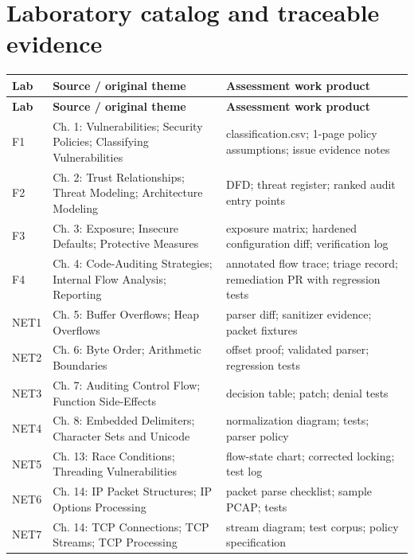 \documentclass[10pt,letterpaper]{article}
\begin{document}
\section{Laboratory catalog and traceable evidence}
\begingroup\footnotesize\setlength\tabcolsep{3pt}
\begin{longtable}{>{\raggedright\arraybackslash}p{}>{\raggedright\arraybackslash}p{}>{\raggedright\arraybackslash}p{}}\toprule
\textbf{Lab} & \textbf{Source / original theme} & \textbf{Assessment work product}\\\midrule\endfirsthead
\toprule \textbf{Lab} & \textbf{Source / original theme} & \textbf{Assessment work product}\\\midrule\endhead
F1 & Ch. 1: Vulnerabilities; Security Policies; Classifying Vulnerabilities & classification.csv; 1-page policy assumptions; issue evidence notes\\\midrule
F2 & Ch. 2: Trust Relationships; Threat Modeling; Architecture Modeling & DFD; threat register; ranked audit entry points\\\midrule
F3 & Ch. 3: Exposure; Insecure Defaults; Protective Measures & exposure matrix; hardened configuration diff; verification log\\\midrule
F4 & Ch. 4: Code-Auditing Strategies; Internal Flow Analysis; Reporting & annotated flow trace; triage record; remediation PR with regression tests\\\midrule
NET1 & Ch. 5: Buffer Overflows; Heap Overflows & parser diff; sanitizer evidence; packet fixtures\\\midrule
NET2 & Ch. 6: Byte Order; Arithmetic Boundaries & offset proof; validated parser; regression tests\\\midrule
NET3 & Ch. 7: Auditing Control Flow; Function Side-Effects & decision table; patch; denial tests\\\midrule
NET4 & Ch. 8: Embedded Delimiters; Character Sets and Unicode & normalization diagram; tests; parser policy\\\midrule
NET5 & Ch. 13: Race Conditions; Threading Vulnerabilities & flow-state chart; corrected locking; test log\\\midrule
NET6 & Ch. 14: IP Packet Structures; IP Options Processing & packet parse checklist; sample PCAP; tests\\\midrule
NET7 & Ch. 14: TCP Connections; TCP Streams; TCP Processing & stream diagram; test corpus; policy specification\\\midrule

\end{longtable}
\end{document}
